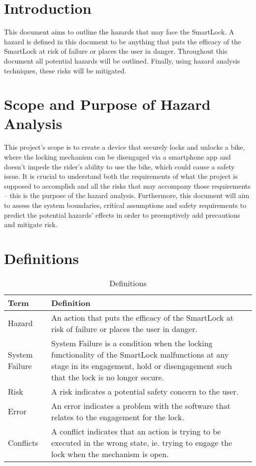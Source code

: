 \documentclass{article}
\begin{document}
\section{Introduction}

This document aims to outline the hazards that may face the SmartLock.  A hazard is defined in this document to be anything that puts the efficacy of the SmartLock at risk of failure or places the user in danger.  Throughout this document all potential hazards will be outlined. Finally, using hazard analysis techniques,  these risks will be mitigated. 

\section{Scope and Purpose of Hazard Analysis}

This project's scope is to create a device that securely locks and unlocks a bike, where the locking mechanism can be disengaged via a smartphone app and doesn’t impede the rider's ability to use the bike, which could cause a safety issue.  It is crucial to understand both the requirements of what the project is supposed to accomplish and all the risks that may accompany those requirements – this is the purpose of the hazard analysis.  Furthermore, this document will aim to assess the system boundaries, critical assumptions and safety requirements to predict the potential hazards' effects in order to preemptively add precautions and mitigate risk. 


\section{Definitions}
\newpage
\begin{table}
\begin{minipage}{\textwidth}
\caption{Definitions}
\renewcommand*{\arraystretch}{1.5}
\begin{tabular}{| p{} | p{} |}
 \hline
 Term & Definition \\ 
 \hline
 Hazard & An action that puts the efficacy of the SmartLock at risk of failure or places the user in danger.\\ 
  \hline
 System Failure & System Failure is a condition when the locking functionality of the SmartLock malfunctions at any stage in its engagement, hold or disengagement such that the lock is no longer secure.\\ 
  \hline
 Risk & A risk indicates a potential safety concern to the user.\\ 
  \hline
 Error & An error indicates a problem with the software that relates to the engagement for the lock.\\ 
  \hline
 Conflicts & A conflict indicates that an action is trying to be executed in the wrong state, ie. trying to engage the lock when the mechanism is open.\\ 
 \hline
\end{tabular}

\end{minipage}
\end{table}
\end{document}
